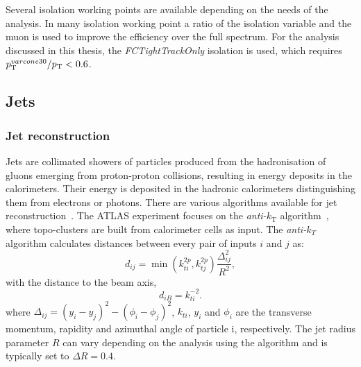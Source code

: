 Several isolation working points are available depending on the needs of the analysis. In many isolation working point a ratio of the isolation variable and the muon \pt is used to improve the efficiency over the full \pt spectrum. For the analysis discussed in this thesis, the \emph{FCTightTrackOnly} isolation is used, which requires $p_{\text{T}}^{varcone30}/p_{\text{T}} < 0.6$. 



\subsection{Jets}

\subsubsection{Jet reconstruction}
Jets are collimated showers of particles produced from the hadronisation of gluons emerging from proton-proton collisions, resulting in energy deposits in the calorimeters. Their energy is deposited in the hadronic calorimeters distinguishing them from electrons or photons. There are various algorithms available for jet reconstruction~\cite{Atkin_2015}. The ATLAS experiment focuses on the \emph{anti-$k_\text{T}$} algorithm~\cite{antikt}, where topo-clusters are built from calorimeter cells as input. The \emph{anti-$k_T$} algorithm calculates distances between every pair of inputs $i$ and $j$ as:
\begin{equation}
    d_{ij} = \min\!\left(k_{ti}^{2p}, k_{tj}^{2p}\right) \frac{\Delta^2_{ij}}{R^2}, 
\end{equation}
with the distance to the beam axis,
\begin{equation}
    d_{iB} = k_{ti}^{-2}.
\end{equation}
where $\Delta_{ij} = (y_i - y_j)^2 - (\phi_i - \phi_j)^2$, $k_{ti}$, $y_i$ and $\phi_i$ are the transverse momentum, rapidity and azimuthal angle of particle i, respectively. The jet radius parameter $R$ can vary depending on the analysis using the algorithm and is typically set to $\Delta R = 0.4$. 

